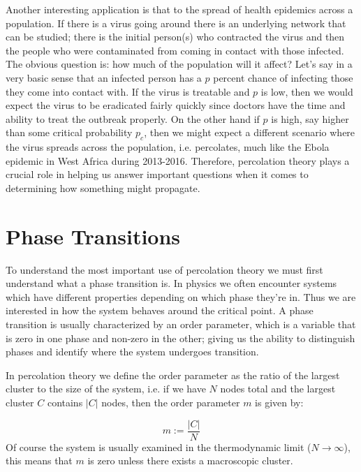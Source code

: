 Another interesting application is that to the spread of health epidemics across a population.
If there is a virus going around there is an underlying network that can be studied; there is the initial person(s) who contracted the virus and then the people who were contaminated from coming in contact with those infected.
The obvious question is: how much of the population will it affect?
Let's say in a very basic sense that an infected person has a $p$ percent chance of infecting those they come into contact with.
If the virus is treatable and $p$ is low, then we would expect the virus to be eradicated fairly quickly since doctors have the time and ability to treat the outbreak properly.
On the other hand if $p$ is high, say higher than some critical probability $p_c$, then we might expect a different scenario where the virus spreads across the population, i.e. percolates, much like the Ebola epidemic in West Africa during 2013-2016.
Therefore, percolation theory plays a crucial role in helping us answer important questions when it comes to determining how something might propagate.



\section{Phase Transitions}
To understand the most important use of percolation theory we must first understand what a phase transition is.
In physics we often encounter systems which have different properties depending on which phase they're in.
Thus we are interested in how the system behaves around the critical point.
A phase transition is usually characterized by an order parameter, which is a variable that is zero in one phase and non-zero in the other; giving us the ability to distinguish phases and identify where the system undergoes transition.

In percolation theory we define the order parameter as the ratio of the largest cluster to the size of the system, i.e. if we have $N$ nodes total and the largest cluster $C$ contains $|C|$ nodes, then the order parameter $m$ is given by:

\begin{equation}
	\label{eqn:order_parameter}
	m := \frac{|C|}{N}
\end{equation}
Of course the system is usually examined in the thermodynamic limit ($N \rightarrow \infty$), this means that $m$ is zero unless there exists a macroscopic cluster.

